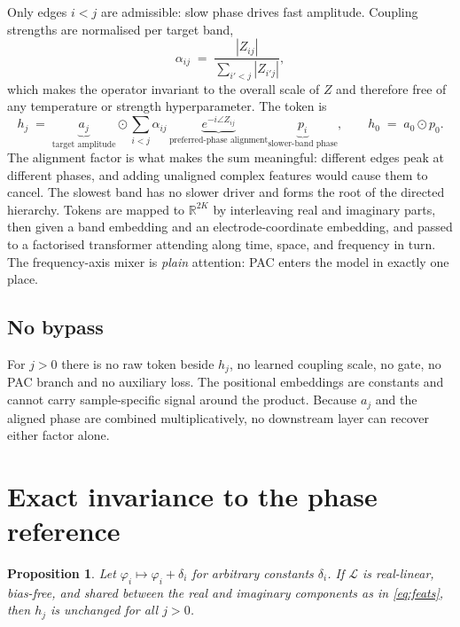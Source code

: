 \documentclass{article}
\newtheorem{proposition}{Proposition}
\begin{document}
Only edges $i<j$ are admissible: slow phase drives fast amplitude. Coupling
strengths are normalised per target band,
\begin{equation}
\alpha_{ij} \;=\; \frac{|Z_{ij}|}{\sum_{i'<j} |Z_{i'j}|},
\end{equation}
which makes the operator invariant to the overall scale of $Z$ and therefore
free of any temperature or strength hyperparameter. The token is
\begin{equation}
\boxed{\;
h_j \;=\; \underbrace{a_j}_{\text{target amplitude}} \odot
\sum_{i<j} \alpha_{ij}\,
\underbrace{e^{-i\angle Z_{ij}}}_{\text{preferred-phase alignment}}
\underbrace{p_i}_{\text{slower-band phase}} ,
\qquad
h_0 \;=\; a_0 \odot p_0 .
\;}
\label{eq:token}
\end{equation}
The alignment factor is what makes the sum meaningful: different edges peak at
different phases, and adding unaligned complex features would cause them to
cancel. The slowest band has no slower driver and forms the root of the directed
hierarchy. Tokens are mapped to $\mathbb{R}^{2K}$ by interleaving real and
imaginary parts, then given a band embedding and an electrode-coordinate
embedding, and passed to a factorised transformer attending along time, space,
and frequency in turn. The frequency-axis mixer is \emph{plain} attention: PAC
enters the model in exactly one place.

\subsection{No bypass}

For $j>0$ there is no raw token beside $h_j$, no learned coupling scale, no gate,
no PAC branch and no auxiliary loss. The positional embeddings are constants and
cannot carry sample-specific signal around the product. Because $a_j$ and the
aligned phase are combined multiplicatively, no downstream layer can recover
either factor alone.

\section{Exact invariance to the phase reference}
\label{sec:gauge}

\begin{proposition}
Let $\varphi_i \mapsto \varphi_i + \delta_i$ for arbitrary constants $\delta_i$.
If $\mathcal{L}$ is real-linear, bias-free, and shared between the real and
imaginary components as in \eqref{eq:feats}, then $h_j$ is unchanged for all
$j>0$.
\end{proposition}
\end{document}
